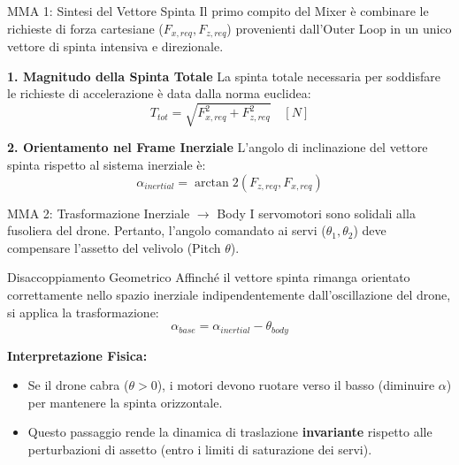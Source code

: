 \documentclass[aspectratio=169]{beamer} %
\begin{document}
\begin{frame}{MMA 1: Sintesi del Vettore Spinta}
    Il primo compito del Mixer è combinare le richieste di forza cartesiane ($F_{x,req}, F_{z,req}$) provenienti dall'Outer Loop in un unico vettore di spinta intensiva e direzionale.

    \vspace{0.2cm}
    \textbf{1. Magnitudo della Spinta Totale}
    La spinta totale necessaria per soddisfare le richieste di accelerazione è data dalla norma euclidea:
    \begin{equation}
        T_{tot} = \sqrt{F_{x,req}^2 + F_{z,req}^2} \quad [N]
    \end{equation}

    \vspace{0.2cm}
    \textbf{2. Orientamento nel Frame Inerziale}
    L'angolo di inclinazione del vettore spinta rispetto al sistema inerziale è:
    \begin{equation}
        \alpha_{inertial} = \arctan2\left( F_{z,req}, F_{x,req} \right)
    \end{equation}    
\end{frame}

\begin{frame}{MMA 2: Trasformazione Inerziale $\to$ Body}
    I servomotori sono solidali alla fusoliera del drone. Pertanto, l'angolo comandato ai servi ($\theta_1, \theta_2$) deve compensare l'assetto del velivolo (Pitch $\theta$).

    \begin{block}{Disaccoppiamento Geometrico}
        Affinché il vettore spinta rimanga orientato correttamente nello spazio inerziale indipendentemente dall'oscillazione del drone, si applica la trasformazione:
        \begin{equation}
            \alpha_{base} = \alpha_{inertial} - \theta_{body}
        \end{equation}
    \end{block}

    \vspace{0.3cm}
    \textbf{Interpretazione Fisica:}
    \begin{itemize}
        \item Se il drone cabra ($\theta > 0$), i motori devono ruotare verso il basso (diminuire $\alpha$) per mantenere la spinta orizzontale.
        \item Questo passaggio rende la dinamica di traslazione \textbf{invariante} rispetto alle perturbazioni di assetto (entro i limiti di saturazione dei servi).
    \end{itemize}
\end{frame}
\end{document}

